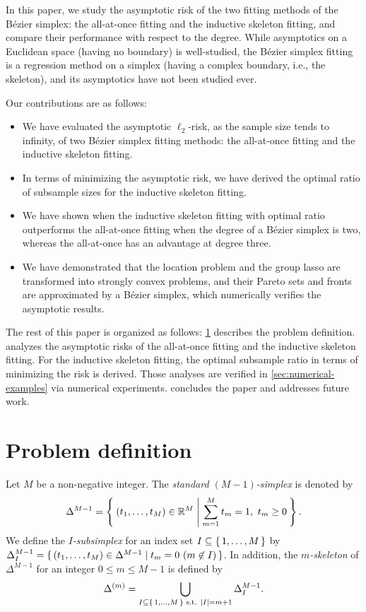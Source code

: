 \documentclass[letterpaper]{article} %
\theoremstyle{plain}
\newcommand{\card}[1]{\left| #1 \right|}
\newcommand{\R}{\mathbb{R}}
\begin{document}
In this paper, we study the asymptotic risk of the two fitting methods of the B\'ezier simplex: the all-at-once fitting and the inductive skeleton fitting, and compare their performance with respect to the degree.
While asymptotics on a Euclidean space (having no boundary) is well-studied, the B\'ezier simplex fitting is a regression method on a simplex (having a complex boundary, i.e., the skeleton), and its asymptotics have not been studied ever.

Our contributions are as follows:
\begin{itemize}
    \item We have evaluated the asymptotic $\ell_2$-risk, as the sample size tends to infinity, of two B\'ezier simplex fitting methods: the all-at-once fitting and the inductive skeleton fitting.
    \item In terms of minimizing the asymptotic risk, we have derived the optimal ratio of subsample sizes for the inductive skeleton fitting.
    \item We have shown when the inductive skeleton fitting with optimal ratio outperforms the all-at-once fitting when the degree of a B\'ezier simplex is two, whereas the all-at-once has an advantage at degree three.
    \item We have demonstrated that the location problem and the group lasso are transformed into strongly convex problems, and their Pareto sets and fronts are approximated by a B\'ezier simplex, which numerically verifies the asymptotic results.
\end{itemize}

The rest of this paper is organized as follows:
\cref{sec:problem-definition} describes the problem definition.
 analyzes the asymptotic risks of the all-at-once fitting and the inductive skeleton fitting.
For the inductive skeleton fitting, the optimal subsample ratio in terms of minimizing the risk is derived.
Those analyses are verified in \cref{sec:numerical-examples} via numerical experiments.
 concludes the paper and addresses future work.


\section{Problem definition}\label{sec:problem-definition}
Let $M$ be a non-negative integer.
The \emph{standard $(M - 1)$-simplex} is denoted by
\[
    \Delta^{M - 1} = \Set{(t_1, \dots, t_M) \in \R^M | \sum_{m = 1}^M t_m = 1,\ t_m \geq 0}.
\]
We define the \emph{$I$-subsimplex} for an index set $I \subseteq \set{1, \dots, M}$ by $\Delta^{M - 1}_I = \set{(t_1, \dots, t_M) \in \Delta^{M - 1} | t_m = 0\ (m \not \in I)}$.
In addition, the \emph{$m$-skeleton} of $\Delta^{M - 1}$ for an integer $0 \leq m \leq M - 1$ is defined by
\[
    \Delta^{(m)} = \bigcup_{I \subseteq \set{1, \dots, M} \text{ s.t. } \card{I} = m + 1} \Delta^{M - 1}_I.
\]
\end{document}
